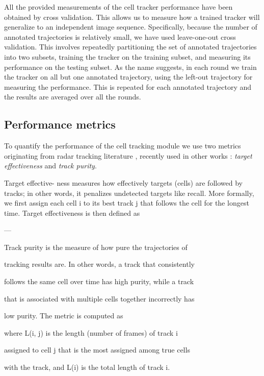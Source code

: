 	All the provided measurements of the cell tracker performance have been obtained by cross validation. This allows us to measure how a trained tracker will generalize to an independent image sequence. Specifically, because the number of annotated trajectories is relatively small, we have used leave-one-out cross validation. This involves repeatedly partitioning the set of annotated trajectories into two subsets, training the tracker on the training subset, and measuring its performance on the testing subset. As the name suggests, in each round we train the tracker on all but one annotated trajectory, using the left-out trajectory for measuring the performance. This is repeated for each annotated trajectory and the results are averaged over all the rounds.

	\subsection{Performance metrics \statusnew}
	
	To quantify the performance of the cell tracking module we use two metrics originating from radar tracking literature \cite{blackman99}, recently used in other works \cite{bise11global, huh13, eom07}: \textit{target effectiveness} and \textit{track purity}.
	
	
	
	Target effective-
	ness measures how effectively targets (cells) are followed by tracks; in other words, it penalizes
	undetected targets like recall. More formally, we first assign each cell i to its best track j that
	follows the cell for the longest time. Target effectiveness is then defined as
	
	
	---
	
		Track purity is the measure of how pure the trajectories of

		tracking results are. In other words, a track that consistently

		follows the same cell over time has high purity, while a track

		that is associated with multiple cells together incorrectly has

		low purity. The metric is computed as
		
		
		where L(i, j) is the length (number of frames) of track i

		assigned to cell j that is the most assigned among true cells

		with the track, and L(i) is the total length of track i.

